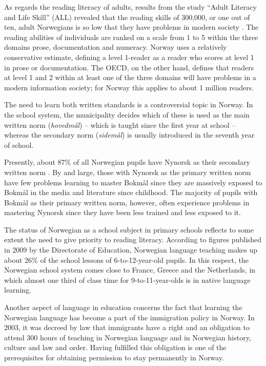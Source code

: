 \begin{multicols}{2}
As regards the reading literacy of adults, results from the study ``Adult Literacy and Life Skill'' (ALL) revealed that the reading skills of 300,000, or one out of ten, adult Norwegians is so low that they have problems in modern society \cite{gab:2005}. 
The reading abilities of individuals are ranked on a scale from 1 to 5 within the three domains prose, documentation and numeracy. 
Norway uses a relatively conservative estimate, defining a level 1-reader as a reader who scores at level 1 in prose or documentation. 
The OECD, on the other hand, defines that readers at level 1 and 2 within at least one of the three domains will have problems in a modern information society; for Norway this applies to about 1 million readers.

The need to learn both written standards is a controversial topic in Norway. 
In the school system, the municipality decides which of these is used as the main written norm (\textit{hovedmål}) -- which is taught since the first year at school -- whereas the secondary norm (\textit{sidemål}) is usually introduced in the seventh year of school. 

Presently, about 87\% of all Norwegian pupils have Nynorsk as their secondary written norm \cite{SR:2010}.
By and large, those with Nynorsk as the primary written norm have few problems learning to master Bokmål since they are massively exposed to Bokmål in the media and literature since childhood. 
The majority of pupils with Bokmål as their primary written norm, however, often experience problems in mastering Nynorsk since they have been less trained and less exposed to it. 

The status of Norwegian as a school subject in primary schools reflects to some extent the need to give priority to reading literacy. 
According to figures published in 2009 by the Directorate of Education, Norwegian language teaching makes up about 26\% of the school lessons of 6-to-12-year-old pupils. 
In this respect, the Norwegian school system comes close to France, Greece and the Netherlands, in which almost one third of class time for 9-to-11-year-olds is in native language learning.

Another aspect of language in education concerns the fact that learning the Norwegian language has become a part of the immigration policy in Norway. 
In 2003, it was decreed by law that immigrants have a right and an obligation to attend 300 hours of teaching in Norwegian language and in Norwegian history, culture and law and order. 
Having fulfilled this obligation is one of the prerequisites for obtaining permission to stay permanently in Norway.


\end{multicols}
